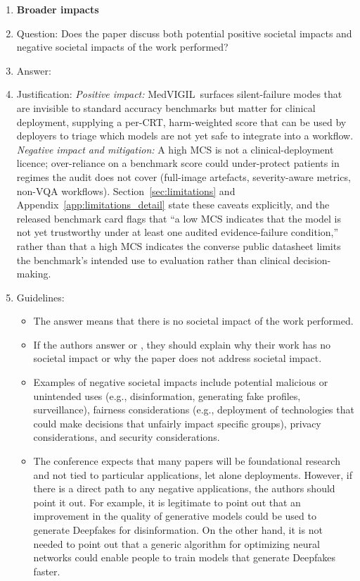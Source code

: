\documentclass{article}
\newcommand{\medvigil}{MedVIGIL}
\providecommand{\DIFaddtex}[1]{{\protect\color{blue} \sf #1}} %
\providecommand{\DIFdeltex}[1]{{\protect\color{red} \scriptsize #1}} %
\providecommand{\DIFaddbegin}{} %
\providecommand{\DIFaddend}{} %
\providecommand{\DIFdelbegin}{} %
\providecommand{\DIFdelend}{} %
\providecommand{\DIFadd}[1]{\texorpdfstring{\DIFaddtex{#1}}{#1}} %
\providecommand{\DIFdel}[1]{\texorpdfstring{\DIFdeltex{#1}}{}} %
\begin{document}
\begin{enumerate}
\item {\bf Broader impacts}
    \item[] Question: Does the paper discuss both potential positive societal impacts and negative societal impacts of the work performed?
    \item[] Answer: \answerYes{}
    \item[] Justification: \emph{Positive impact:} \medvigil\ surfaces silent-failure modes that are invisible to standard accuracy benchmarks but matter for clinical deployment, supplying a per-CRT, harm-weighted score that can be used by deployers to triage which models are not yet safe to integrate into a workflow. \emph{Negative impact and mitigation:} A high MCS is not a clinical-deployment licence; over-reliance on a benchmark score could under-protect patients in regimes the audit does not cover (full-image artefacts, severity-aware metrics, non-VQA workflows). Section~\ref{sec:limitations} and Appendix~\ref{app:limitations_detail} state these caveats explicitly, and the \DIFdelbegin \DIFdel{released benchmark card flags that ``a low MCS indicates that the model is not yet trustworthy under at least one audited evidence-failure condition,'' rather than that a high MCS indicates the converse}\DIFdelend \DIFaddbegin \DIFadd{public datasheet limits the benchmark's intended use to evaluation rather than clinical decision-making}\DIFaddend .
    \item[] Guidelines:
    \begin{itemize}
        \item The answer \answerNA{} means that there is no societal impact of the work performed.
        \item If the authors answer \answerNA{} or \answerNo, they should explain why their work has no societal impact or why the paper does not address societal impact.
        \item Examples of negative societal impacts include potential malicious or unintended uses (e.g., disinformation, generating fake profiles, surveillance), fairness considerations (e.g., deployment of technologies that could make decisions that unfairly impact specific groups), privacy considerations, and security considerations.
        \item The conference expects that many papers will be foundational research and not tied to particular applications, let alone deployments. However, if there is a direct path to any negative applications, the authors should point it out. For example, it is legitimate to point out that an improvement in the quality of generative models could be used to generate Deepfakes for disinformation. On the other hand, it is not needed to point out that a generic algorithm for optimizing neural networks could enable people to train models that generate Deepfakes faster.

\end{itemize}
\end{enumerate}
\end{document}

